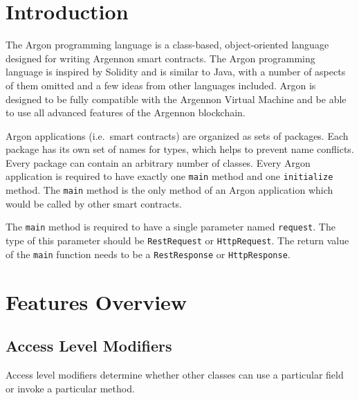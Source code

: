 

\section{Introduction}\label{sec:introduction2}

The Argon programming language is a class-based, object-oriented language designed for writing Argennon smart
contracts. The Argon programming language is inspired by Solidity and is similar to Java, with a number of aspects
of them omitted and a few ideas from other languages included. Argon is designed to be fully compatible with
the Argennon Virtual Machine and be able to use all advanced features of the Argennon blockchain.

Argon applications (i.e.\ smart contracts) are organized as sets of packages. Each package has its own set of names
for types, which helps to prevent name conflicts. Every package can contain an arbitrary number of classes.
Every Argon application is required
to have exactly one \texttt{main} method and one \texttt{initialize} method. The \texttt{main} method is the
only method of an Argon application which would be called by other smart contracts.

The \texttt{main} method is required to have a single parameter named \texttt{request}. The type of this parameter
should be \texttt{RestRequest} or \texttt{HttpRequest}. The return value of the \texttt{main} function needs to be a
\texttt{RestResponse} or \texttt{HttpResponse}.


\section{Features Overview}\label{sec:features-overview}

\subsection{Access Level Modifiers}\label{subsec:access-level-modifiers}

Access level modifiers determine whether other classes can use a particular field or invoke a particular method.

